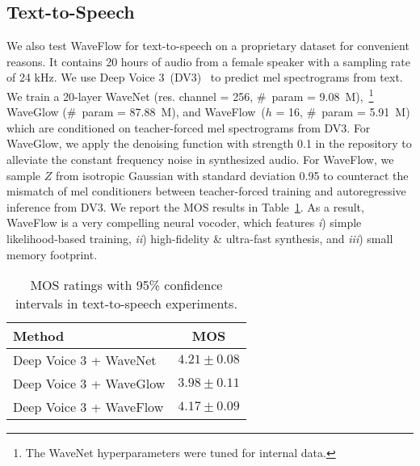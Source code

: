 \documentclass{article}
\begin{document}
\vspace{-.2em}
\subsection{Text-to-Speech}
\vspace{-.1em}
We also test WaveFlow for text-to-speech on a proprietary dataset for convenient reasons. It contains 20 hours of audio from a female speaker with a sampling rate of 24 kHz. We use Deep Voice 3~(DV3)~\citep{ping2017deep} to predict mel spectrograms from text. We train a 20-layer WaveNet (res. channel = 256, \#~param = {9.08~M}),~\footnote{The WaveNet hyperparameters were tuned for internal data.} 
WaveGlow (\#~param = {87.88~M}), and WaveFlow~($h$ = 16, \#~param = {5.91~M}) which are conditioned on teacher-forced mel spectrograms from DV3.
For WaveGlow, we apply the denoising function with strength 0.1 in the repository to alleviate the constant frequency noise in synthesized audio.
For WaveFlow, we sample $Z$ from isotropic Gaussian with standard deviation 0.95 to counteract the mismatch of mel conditioners between teacher-forced training and autoregressive inference from DV3.
We report the MOS results in Table~\ref{tab:tts-mos}.
As a result, WaveFlow is a very compelling neural vocoder, which features \emph{i}) simple likelihood-based training, \emph{ii}) high-fidelity \& ultra-fast synthesis, and \emph{iii}) small memory footprint.

\begin{table}[t]
\centering
\vspace{-1.2em}
\caption{MOS ratings with 95\% confidence intervals in text-to-speech experiments.}
\label{tab:tts-mos}
\vspace{0.2em}
\begin{tabular}{l|c}
\hline
\textbf{ Method }  & \textbf{MOS} \\ \hline
Deep Voice 3 + WaveNet & $ 4.21 \pm 0.08$  \\ 
Deep Voice 3 + WaveGlow  & $ 3.98 \pm 0.11$  \\ 
Deep Voice 3 + WaveFlow  & $ 4.17 \pm 0.09$  \\    \hline
\end{tabular}
\vspace{-1.0em}
\end{table}


\vspace{-.2em}
\end{document}
